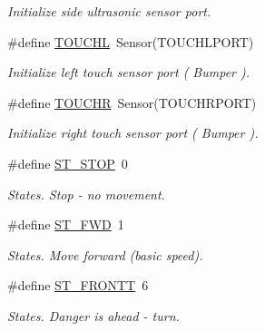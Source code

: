\begin{DoxyCompactItemize}
\begin{DoxyCompactList}\small\item\em Initialize side ultrasonic sensor port. \item\end{DoxyCompactList}\item 
\hypertarget{fence_8nxc_a98c4f75c182ff1c7c6f3fb288f4f3857}{
\#define \hyperlink{fence_8nxc_a98c4f75c182ff1c7c6f3fb288f4f3857}{TOUCHL}~Sensor(TOUCHLPORT)}
\label{fence_8nxc_a98c4f75c182ff1c7c6f3fb288f4f3857}

\begin{DoxyCompactList}\small\item\em Initialize left touch sensor port ( Bumper ). \item\end{DoxyCompactList}\item 
\hypertarget{fence_8nxc_a6537370af17fd38a56bcf670d8db23e3}{
\#define \hyperlink{fence_8nxc_a6537370af17fd38a56bcf670d8db23e3}{TOUCHR}~Sensor(TOUCHRPORT)}
\label{fence_8nxc_a6537370af17fd38a56bcf670d8db23e3}

\begin{DoxyCompactList}\small\item\em Initialize right touch sensor port ( Bumper ). \item\end{DoxyCompactList}\item 
\hypertarget{fence_8nxc_a8ccbe4f289c6182e18589c6f2c6108ee}{
\#define \hyperlink{fence_8nxc_a8ccbe4f289c6182e18589c6f2c6108ee}{ST\_\-STOP}~0}
\label{fence_8nxc_a8ccbe4f289c6182e18589c6f2c6108ee}

\begin{DoxyCompactList}\small\item\em States. Stop -\/ no movement. \item\end{DoxyCompactList}\item 
\hypertarget{fence_8nxc_abba849981e74e84eb3836d3c03c363a9}{
\#define \hyperlink{fence_8nxc_abba849981e74e84eb3836d3c03c363a9}{ST\_\-FWD}~1}
\label{fence_8nxc_abba849981e74e84eb3836d3c03c363a9}

\begin{DoxyCompactList}\small\item\em States. Move forward (basic speed). \item\end{DoxyCompactList}\item 
\hypertarget{fence_8nxc_a82671cbfd87d61e73ed46e39a25ea515}{
\#define \hyperlink{fence_8nxc_a82671cbfd87d61e73ed46e39a25ea515}{ST\_\-FRONTT}~6}
\label{fence_8nxc_a82671cbfd87d61e73ed46e39a25ea515}

\begin{DoxyCompactList}\small\item\em States. Danger is ahead -\/ turn. \item\end{DoxyCompactList}\end{DoxyCompactItemize}
